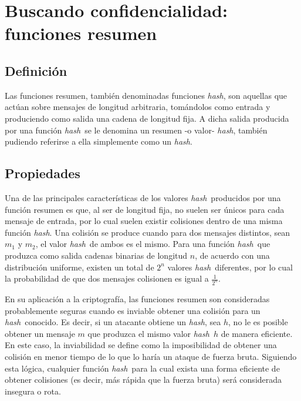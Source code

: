 \documentclass[12pt,spanish,listoffigures,listoftables]{tfgetsinf}
\newcommand{\hash}{\textit{hash}}
\begin{document}



\chapter{Buscando confidencialidad: funciones resumen}

\section{Definición}

Las funciones resumen, también denominadas funciones \hash, son aquellas que actúan sobre mensajes de longitud arbitraria, tomándolos como entrada y produciendo como salida una cadena de longitud fija. A dicha salida producida por una función \hash~se le denomina un resumen -o valor- \hash, también pudiendo referirse a ella simplemente como un \hash.

\section{Propiedades}

Una de las principales características de los valores \hash~producidos por una función resumen es que, al ser de longitud fija, no suelen ser únicos para cada mensaje de entrada, por lo cual suelen existir colisiones dentro de una misma función \hash. Una colisión se produce cuando para dos mensajes distintos, sean $m_1$ y $m_2$, el valor \hash~de ambos es el mismo. Para una función \hash~que produzca como salida cadenas binarias de longitud $n$, de acuerdo con una distribución uniforme, existen un total de $2^n$ valores \hash~diferentes, por lo cual la probabilidad de que dos mensajes colisionen es igual a $\frac{1}{2^n}$.

En su aplicación a la criptografía, las funciones resumen son consideradas probablemente seguras cuando es inviable obtener una colisión para un \hash~conocido. Es decir, si un atacante obtiene un \hash, sea $h$, no le es posible obtener un mensaje $m$ que produzca el mismo valor \hash~$h$ de manera eficiente. En este caso, la inviabilidad se define como la imposibilidad de obtener una colisión en menor tiempo de lo que lo haría un ataque de fuerza bruta. Siguiendo esta lógica, cualquier función \hash~para la cual exista una forma eficiente de obtener colisiones (es decir, más rápida que la fuerza bruta) será considerada insegura o rota.
\end{document}
